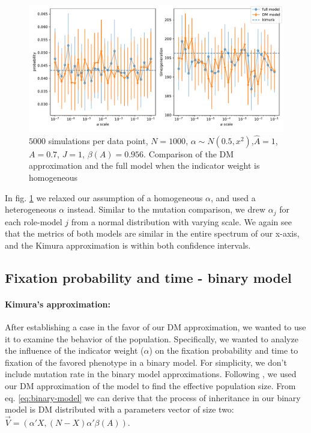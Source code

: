 \documentclass[11pt]{article}
\begin{document}
\begin{figure}
    \includegraphics[width=\linewidth]{../figures/binary/full_vs_dm_changing_alpha.pdf}
  \caption{$5000$ simulations per data point, $N=1000$, $\alpha\sim N(0.5,x^2)$,$\hat{A}=1$,$A=0.7$, $J=1$, $\beta(A)=0.956$.
  Comparison of the DM approximation and the full model when the indicator weight is homogeneous}	
  \label{fig:hetro_alpha}
\end{figure}

In fig. \ref{fig:hetro_alpha} we relaxed our assumption of a homogeneous $\alpha$, and used a heterogeneous $\alpha$ instead. Similar to the mutation comparison, we drew $\alpha_j$ for each role-model $j$ from a normal distribution with varying scale. We again see that the metrics of both models are similar in the entire spectrum of our x-axis, and the Kimura approximation is within both confidence intervals.

\subsection{Fixation probability and time - binary model}
\paragraph{Kimura's approximation:}
After establishing a case in the favor of our DM approximation, we wanted to use it to examine the behavior of the population. Specifically, we wanted to analyze the influence of the indicator weight ($\alpha$) on the fixation probability and time to fixation of the favored phenotype in a binary model.
For simplicity, we don't include mutation rate in the binary model approximations.
Following \citet{durret}, we used our DM approximation of the model to find the effective population size. From eq. \ref{eq:binary-model} we can derive that the process of inheritance in our binary model is DM distributed with a parameters vector of size two: $\vec{V}=(\alpha'X,(N-X)\alpha'\beta(A))$.
\end{document}
